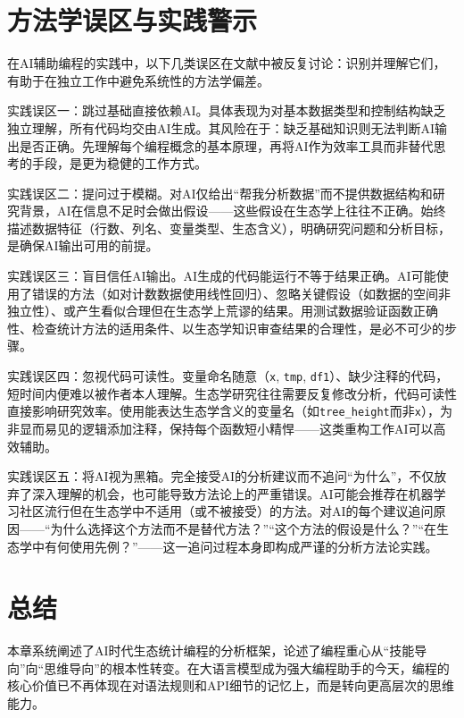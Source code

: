 \documentclass[
  twoside,12pt,fontset=none]{ctexbook}
\begin{document}
\hypertarget{ux65b9ux6cd5ux5b66ux8befux533aux4e0eux5b9eux8df5ux8b66ux793a}{%
\section{方法学误区与实践警示}\label{ux65b9ux6cd5ux5b66ux8befux533aux4e0eux5b9eux8df5ux8b66ux793a}}

在AI辅助编程的实践中，以下几类误区在文献中被反复讨论：识别并理解它们，有助于在独立工作中避免系统性的方法学偏差。

实践误区一：跳过基础直接依赖AI。具体表现为对基本数据类型和控制结构缺乏独立理解，所有代码均交由AI生成。其风险在于：缺乏基础知识则无法判断AI输出是否正确。先理解每个编程概念的基本原理，再将AI作为效率工具而非替代思考的手段，是更为稳健的工作方式。

实践误区二：提问过于模糊。对AI仅给出``帮我分析数据''而不提供数据结构和研究背景，AI在信息不足时会做出假设------这些假设在生态学上往往不正确。始终描述数据特征（行数、列名、变量类型、生态含义），明确研究问题和分析目标，是确保AI输出可用的前提。

实践误区三：盲目信任AI输出。AI生成的代码能运行不等于结果正确。AI可能使用了错误的方法（如对计数数据使用线性回归）、忽略关键假设（如数据的空间非独立性）、或产生看似合理但在生态学上荒谬的结果。用测试数据验证函数正确性、检查统计方法的适用条件、以生态学知识审查结果的合理性，是必不可少的步骤。

实践误区四：忽视代码可读性。变量命名随意（\texttt{x}, \texttt{tmp}, \texttt{df1}）、缺少注释的代码，短时间内便难以被作者本人理解。生态学研究往往需要反复修改分析，代码可读性直接影响研究效率。使用能表达生态学含义的变量名（如\texttt{tree\_height}而非\texttt{x}），为非显而易见的逻辑添加注释，保持每个函数短小精悍------这类重构工作AI可以高效辅助。

实践误区五：将AI视为黑箱。完全接受AI的分析建议而不追问``为什么''，不仅放弃了深入理解的机会，也可能导致方法论上的严重错误。AI可能会推荐在机器学习社区流行但在生态学中不适用（或不被接受）的方法。对AI的每个建议追问原因------``为什么选择这个方法而不是替代方法？''``这个方法的假设是什么？''``在生态学中有何使用先例？''------这一追问过程本身即构成严谨的分析方法论实践。

\hypertarget{ux603bux7ed3}{%
\section{总结}\label{ux603bux7ed3}}

本章系统阐述了AI时代生态统计编程的分析框架，论述了编程重心从``技能导向''向``思维导向''的根本性转变。在大语言模型成为强大编程助手的今天，编程的核心价值已不再体现在对语法规则和API细节的记忆上，而是转向更高层次的思维能力。
\end{document}
